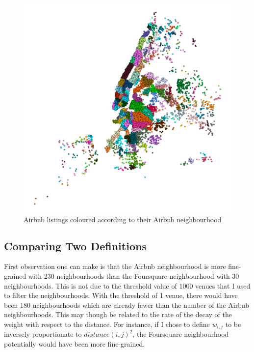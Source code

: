 \begin{figure}
\centering
\includegraphics[width=\columnwidth]{../nbh_foo.png}
\caption{Airbnb listings coloured according to their Airbnb neighbourhood}
\label{fig:abnb-nbh}
\end{figure}
\subsection{Comparing Two Definitions}
First observation one can make is that the Airbnb neighbourhood is more fine-grained with 230 neighbourhoods than the Foursquare neighbourhood with 30 neighbourhoods. This is not due to the threshold value of 1000 venues that I used to filter the neighbourhoods. With the threshold of 1 venue, there would have been 180 neighbourhoods which are already fewer than the number of the Airbnb neighbourhoods. This may though be related to the rate of the decay of the weight with respect to the distance. For instance, if I chose to define $w_{i, j}$ to be inversely proportionate to $distance(i, j)^2$, the Foursquare neighbourhood potentially would have been more fine-grained.

